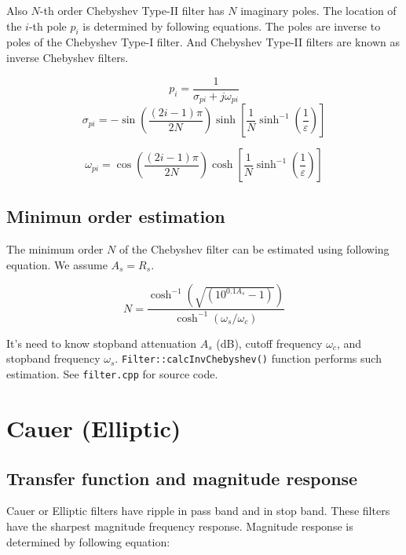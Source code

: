 Also $N$-th order Chebyshev Type-II filter has $N$ imaginary poles. The
location of the $i$-th pole $p_i$ is determined by following equations. The
poles are inverse to poles of the Chebyshev Type-I filter. And Chebyshev
Type-II filters are known as inverse Chebyshev filters.

\begin{equation}
 p_{i} = \frac{1}{\sigma_{pi}+j\omega_{pi}}
\end{equation}
\begin{equation}
 \sigma_{pi} = -\sin\left(\frac{(2i-1)\pi}{2N}\right)           
\sinh\left[\frac{1}{N}\sinh^{-1}\left(\frac{1}{\varepsilon}\right)\right]
\end{equation}

\begin{equation}
 \omega_{pi} = \cos\left(\frac{(2i-1)\pi}{2N}\right)           
\cosh\left[\frac{1}{N}\sinh^{-1}\left(\frac{1}{\varepsilon}\right)\right]
\end{equation}

\subsection{Minimun order estimation}

The minimum order $N$ of the Chebyshev filter can be estimated using following
equation. We assume $A_s=R_s$.

\begin{equation}
 N = \frac{\cosh^{-1}(\sqrt{(10^{0.1A_s}-1)})}{\cosh^{-1}(\omega_s/\omega_c)}
\label{cheby2-order}
\end{equation}

It's need to
know stopband attenuation $A_s$ (dB), cutoff
frequency $\omega_c$, and stopband frequency $\omega_s$.
\verb|Filter::calcInvChebyshev()| function performs such estimation. See
\verb|filter.cpp| for source code.

\section{Cauer (Elliptic)}

\subsection{Transfer function and magnitude response}

Cauer or Elliptic filters have ripple in pass band and in stop band. These
filters have the sharpest magnitude frequency response. Magnitude response is
determined by following equation:

